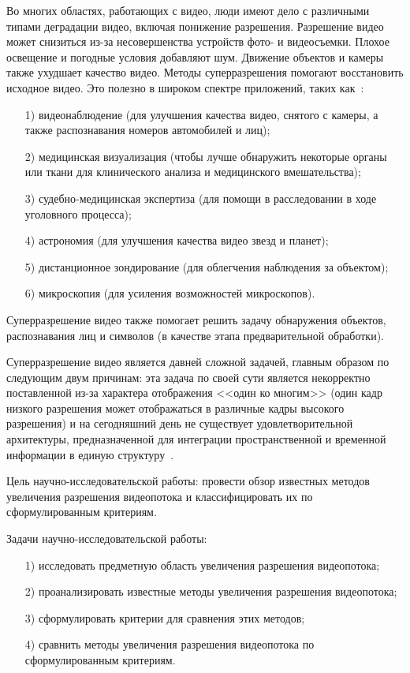 \documentclass{bmstu}
\begin{document}
Во многих областях, работающих с видео, люди имеют дело с различными типами деградации видео, включая понижение разрешения. 
Разрешение видео может снизиться из-за несовершенства устройств фото- и видеосъемки. 
Плохое освещение и погодные условия добавляют шум. 
Движение объектов и камеры также ухудшает качество видео. 
Методы суперразрешения помогают восстановить исходное видео. 
Это полезно в широком спектре приложений, таких как~\cite{Daithankar2021}:
\begin{enumerate}
\item[1)] видеонаблюдение (для улучшения качества видео, снятого с камеры, а также распознавания номеров автомобилей и лиц);
\item[2)] медицинская визуализация (чтобы лучше обнаружить некоторые органы или ткани для клинического анализа и медицинского вмешательства);
\item[3)] судебно-медицинская экспертиза (для помощи в расследовании в ходе уголовного процесса);
\item[4)] астрономия (для улучшения качества видео звезд и планет);
\item[5)] дистанционное зондирование (для облегчения наблюдения за объектом);
\item[6)] микроскопия (для усиления возможностей микроскопов).
\end{enumerate}

Суперразрешение видео также помогает решить задачу обнаружения объектов, распознавания лиц и символов (в качестве этапа предварительной обработки).

Суперразрешение видео является давней сложной задачей, главным образом по следующим двум причинам: эта задача по своей сути является некорректно поставленной из-за характера отображения <<один ко многим>> (один кадр низкого разрешения может отображаться в различные кадры высокого разрешения) и на сегодняшний день не существует удовлетворительной архитектуры, предназначенной для интеграции пространственной и временной информации в единую структуру~\cite{Xiaobin2019}.

Цель научно-исследовательской работы: провести обзор известных методов увеличения разрешения видеопотока и классифицировать их по сформулированным критериям.

Задачи научно-исследовательской работы:
\begin{enumerate}
\item[1)] исследовать предметную область увеличения разрешения видеопотока;
\item[2)] проанализировать известные методы увеличения разрешения видеопотока;
\item[3)] сформулировать критерии для сравнения этих методов;
\item[4)] сравнить методы увеличения разрешения видеопотока по сформулированным критериям.
\end{enumerate}
\end{document}
